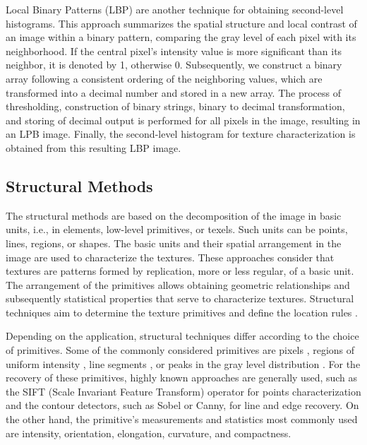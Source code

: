 Local Binary Patterns (LBP) \citep{Ojala.Pietikainen.ea:PR:1996} are another technique for obtaining second-level histograms. This approach summarizes the spatial structure and local contrast of an image within a binary pattern, comparing the gray level of each pixel with its neighborhood. If the central pixel's intensity value is more significant than its neighbor, it is denoted by 1, otherwise 0. Subsequently, we construct a binary array following a consistent ordering of the neighboring values, which are transformed into a decimal number and stored in a new array. The process of thresholding, construction of binary strings, binary to decimal transformation, and storing of decimal output is performed for all pixels in the image, resulting in an LPB image. Finally, the second-level histogram for texture characterization is obtained from this resulting LBP image.


\subsection{Structural Methods}
The structural methods are based on the decomposition of the image in basic units, i.e., in elements, low-level primitives, or texels. Such units can be points, lines, regions, or shapes. The basic units and their spatial arrangement in the image are used to characterize the textures. These approaches consider that textures are patterns formed by replication, more or less regular, of a basic unit. The arrangement of the primitives allows obtaining geometric relationships and subsequently statistical properties that serve to characterize textures. Structural techniques aim to determine the texture primitives and define the location rules \citep{Humeau-Heurtier:ACCESS:2019}.

Depending on the application, structural techniques differ according to the choice of primitives. Some of the commonly considered primitives are pixels \citep{Lu.Fu:CGIP:1978}, regions of uniform intensity \citep{Tuceryan.Jain:WS:1993}, line segments \citep{Carlucci:PR:1972}, or peaks in the gray level distribution \citep{Ehrich.Foith:CGIP:1978}. For the recovery of these primitives, highly known approaches are generally used, such as the SIFT (Scale Invariant Feature Transform) operator for points characterization and the contour detectors, such as Sobel or Canny, for line and edge recovery. On the other hand, the primitive's measurements and statistics most commonly used are intensity, orientation, elongation, curvature, and compactness.

